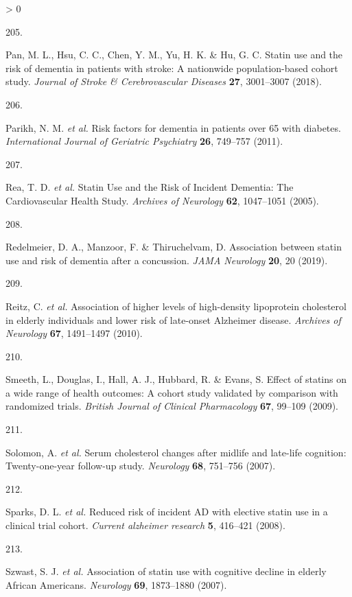 \documentclass[a4paper, twoside]{templates/ociamthesis}
\newlength{\cslhangindent}
\newlength{\csllabelwidth}
\newenvironment{CSLReferences}[3] %
 {%
  \setlength{\parindent}{0pt}
  \ifodd #1 \everypar{\setlength{\hangindent}{\cslhangindent}}\ignorespaces\fi
  \ifnum #2 > 0
  \setlength{\parskip}{#2\baselineskip}
  \fi
 }%
 {}
\newcommand{\CSLLeftMargin}[1]{\parbox[t]{\maxof{\widthof{#1}}{\csllabelwidth}}{#1}}
\newcommand{\CSLRightInline}[1]{\parbox[t]{\linewidth - \csllabelwidth}{#1}}
\begin{document}
\begin{CSLReferences}{0}{0}
\leavevmode\hypertarget{ref-pan2018}{}%
\CSLLeftMargin{205. }
\CSLRightInline{Pan, M. L., Hsu, C. C., Chen, Y. M., Yu, H. K. \& Hu, G. C. Statin use and the risk of dementia in patients with stroke: A nationwide population-based cohort study. \emph{Journal of Stroke \& Cerebrovascular Diseases} \textbf{27}, 3001--3007 (2018).}

\leavevmode\hypertarget{ref-parikh2011}{}%
\CSLLeftMargin{206. }
\CSLRightInline{Parikh, N. M. \emph{et al.} Risk factors for dementia in patients over 65 with diabetes. \emph{International Journal of Geriatric Psychiatry} \textbf{26}, 749--757 (2011).}

\leavevmode\hypertarget{ref-rea2005}{}%
\CSLLeftMargin{207. }
\CSLRightInline{Rea, T. D. \emph{et al.} Statin {Use} and the {Risk} of {Incident Dementia}: The {Cardiovascular Health Study}. \emph{Archives of Neurology} \textbf{62}, 1047--1051 (2005).}

\leavevmode\hypertarget{ref-redelmeier2019}{}%
\CSLLeftMargin{208. }
\CSLRightInline{Redelmeier, D. A., Manzoor, F. \& Thiruchelvam, D. Association between statin use and risk of dementia after a concussion. \emph{JAMA Neurology} \textbf{20}, 20 (2019).}

\leavevmode\hypertarget{ref-reitz2010}{}%
\CSLLeftMargin{209. }
\CSLRightInline{Reitz, C. \emph{et al.} Association of higher levels of high-density lipoprotein cholesterol in elderly individuals and lower risk of late-onset {Alzheimer} disease. \emph{Archives of Neurology} \textbf{67}, 1491--1497 (2010).}

\leavevmode\hypertarget{ref-smeeth2009}{}%
\CSLLeftMargin{210. }
\CSLRightInline{Smeeth, L., Douglas, I., Hall, A. J., Hubbard, R. \& Evans, S. Effect of statins on a wide range of health outcomes: A cohort study validated by comparison with randomized trials. \emph{British Journal of Clinical Pharmacology} \textbf{67}, 99--109 (2009).}

\leavevmode\hypertarget{ref-solomon2007}{}%
\CSLLeftMargin{211. }
\CSLRightInline{Solomon, A. \emph{et al.} Serum cholesterol changes after midlife and late-life cognition: Twenty-one-year follow-up study. \emph{Neurology} \textbf{68}, 751--756 (2007).}

\leavevmode\hypertarget{ref-sparks2008}{}%
\CSLLeftMargin{212. }
\CSLRightInline{Sparks, D. L. \emph{et al.} Reduced risk of incident {AD} with elective statin use in a clinical trial cohort. \emph{Current alzheimer research} \textbf{5}, 416--421 (2008).}

\leavevmode\hypertarget{ref-szwast2007}{}%
\CSLLeftMargin{213. }
\CSLRightInline{Szwast, S. J. \emph{et al.} Association of statin use with cognitive decline in elderly {African Americans}. \emph{Neurology} \textbf{69}, 1873--1880 (2007).}


\end{CSLReferences}
\end{document}

